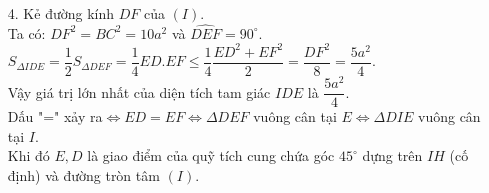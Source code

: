 \begin{ex}
{\begin{enumerate}
  Ta có: $\heva{&\widehat{PMK}=\dfrac{\widehat{BMN}}{2}\\&\widehat{MAP}=\dfrac{\widehat{MAH}}{2}=\dfrac{\widehat{ACB}}{2}}$.\\
  Mà $\widehat{BMN}+\widehat{BCA}=180^\circ$ (chứng minh trên) $\Rightarrow \widehat{PMK}+\widehat{MAP}=90^\circ$.\\
  Từ đó suy ra: $\widehat{PAN}=\widehat{PMN}$ hay tứ giác $MPNA$ nội tiếp một đường tròn.\\
  Chứng minh tương tự ta cũng có tứ giác $AMQN$ nội tiếp một đường tròn.\\
  Vậy $5$ điểm $A,M,Q,N,P$ cùng thuộc một đường tròn.
  \item[4.] Kẻ đường kính $DF$ của $(I)$.\\
  Ta có: $DF^2=BC^2=10a^2$ và $\widehat{DEF}=90^\circ$.\\
  $S_{\Delta IDE}=\dfrac{1}{2}S_{\Delta DEF}=\dfrac{1}{4}ED.EF\le \dfrac{1}{4}\dfrac{ED^2+EF^2}{2}=\dfrac{DF^2}{8}=\dfrac{5a^2}{4}$.\\
  Vậy giá trị lớn nhất của diện tích tam giác $IDE$ là $\dfrac{5a^2}{4}$.\\
  Dấu "=" xảy ra$\Leftrightarrow ED=EF\Leftrightarrow \Delta DEF$ vuông cân tại $E\Leftrightarrow\Delta DIE$ vuông cân tại $I$.\\
  Khi đó $E,D$ là giao điểm của quỹ tích cung chứa góc $45^\circ$ dựng trên $IH$ (cố định) và đường tròn tâm $(I)$. 
   \end{enumerate}
    }
\end{ex}

